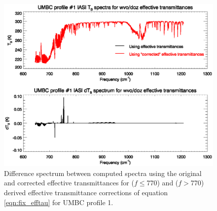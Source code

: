 \begin{figure}[htp]
  \centering
  \includegraphics[bb=70 219 540 395,clip,scale=0.8]{graphics/dozwvo_rtdiff.eps}
  \caption{Difference spectrum between computed spectra using the original and corrected effective transmittances for  ($f\leq$770\invcm) and  ($f>$770\invcm) derived effective transmittance corrections of equation \ref{eqn:fix_efftau} for UMBC profile 1.}
  \label{fig:dozwvo_rtdiff}
\end{figure}




	


\begin{appendix}

  

\end{appendix}


